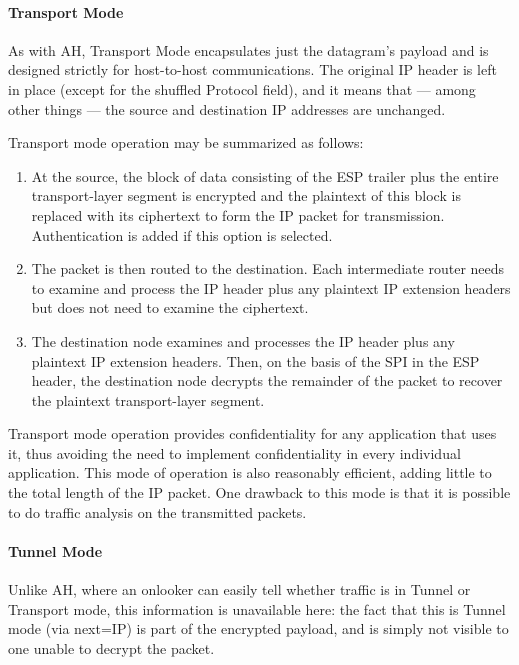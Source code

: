 \documentclass[12pt]{article}
\begin{document}
\paragraph{Transport Mode}
As with AH, Transport Mode encapsulates just the datagram's payload and is designed strictly for host-to-host communications. The original IP header is left in place (except for the shuffled Protocol field), and it means that — among other things — the source and destination IP addresses are unchanged.

Transport mode operation may be summarized as follows:
\begin{enumerate}
\item At the source, the block of data consisting of the ESP trailer plus the entire transport-layer segment is encrypted and the plaintext of this block is replaced with its ciphertext to form the IP packet for transmission. Authentication is added if this option is selected.
\item 
The packet is then routed to the destination. Each intermediate router needs to examine and process the IP header plus any plaintext IP extension headers but does not need to examine the ciphertext.
\item
The destination node examines and processes the IP header plus any plaintext IP extension headers. Then, on the basis of the SPI in the ESP header, the destination node decrypts the remainder of the packet to recover the plaintext transport-layer segment.
\end{enumerate}
Transport mode operation provides confidentiality for any application that uses it, thus avoiding the need to implement confidentiality in every individual application. This mode of operation is also reasonably efficient, adding little to the total length of the IP packet. One drawback to this mode is that it is possible to do traffic analysis on the transmitted packets.


\paragraph{Tunnel Mode}
Unlike AH, where an onlooker can easily tell whether traffic is in Tunnel or Transport mode, this information is unavailable here: the fact that this is Tunnel mode (via next=IP) is part of the encrypted payload, and is simply not visible to one unable to decrypt the packet.
\end{document}
